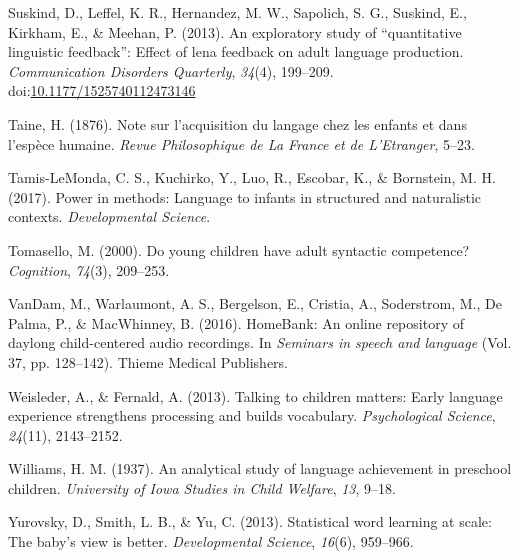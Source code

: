 \documentclass[man]{apa6}
\theoremstyle{definition}
\theoremstyle{definition}
\theoremstyle{definition}
\theoremstyle{remark}
\begin{document}
\hypertarget{ref-suskind2013exploratory}{}
Suskind, D., Leffel, K. R., Hernandez, M. W., Sapolich, S. G., Suskind,
E., Kirkham, E., \& Meehan, P. (2013). An exploratory study of
``quantitative linguistic feedback'': Effect of lena feedback on adult
language production. \emph{Communication Disorders Quarterly},
\emph{34}(4), 199--209.
doi:\href{https://doi.org/10.1177/1525740112473146}{10.1177/1525740112473146}

\hypertarget{ref-taine1876note}{}
Taine, H. (1876). Note sur l'acquisition du langage chez les enfants et
dans l'espèce humaine. \emph{Revue Philosophique de La France et de
L'Etranger}, 5--23.

\hypertarget{ref-tamis2017power}{}
Tamis-LeMonda, C. S., Kuchirko, Y., Luo, R., Escobar, K., \& Bornstein,
M. H. (2017). Power in methods: Language to infants in structured and
naturalistic contexts. \emph{Developmental Science}.

\hypertarget{ref-tomasello2000young}{}
Tomasello, M. (2000). Do young children have adult syntactic competence?
\emph{Cognition}, \emph{74}(3), 209--253.

\hypertarget{ref-vandam2016homebank}{}
VanDam, M., Warlaumont, A. S., Bergelson, E., Cristia, A., Soderstrom,
M., De Palma, P., \& MacWhinney, B. (2016). HomeBank: An online
repository of daylong child-centered audio recordings. In \emph{Seminars
in speech and language} (Vol. 37, pp. 128--142). Thieme Medical
Publishers.

\hypertarget{ref-weisleder2013talking}{}
Weisleder, A., \& Fernald, A. (2013). Talking to children matters: Early
language experience strengthens processing and builds vocabulary.
\emph{Psychological Science}, \emph{24}(11), 2143--2152.

\hypertarget{ref-williams1937analytical}{}
Williams, H. M. (1937). An analytical study of language achievement in
preschool children. \emph{University of Iowa Studies in Child Welfare},
\emph{13}, 9--18.

\hypertarget{ref-yurovsky2013statistical}{}
Yurovsky, D., Smith, L. B., \& Yu, C. (2013). Statistical word learning
at scale: The baby's view is better. \emph{Developmental Science},
\emph{16}(6), 959--966.
\end{document}
